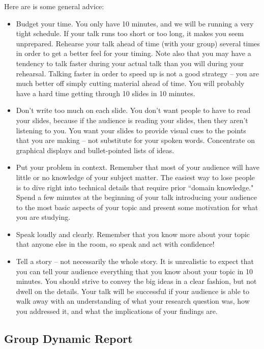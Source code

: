 \documentclass[10pt]{article}
\begin{document}
Here are is some general advice:
	\begin{itemize}
		\item Budget your time. You only have 10 minutes, and we will be running a very tight schedule. If your talk runs too short or too long, it makes you seem unprepared. Rehearse your talk ahead of time (with your group) several times in order to get a better feel for your timing. Note also that you may have a tendency to talk faster during your actual talk than you will during your rehearsal. Talking faster in order to speed up is not a good strategy -- you are much better off simply cutting material ahead of time. You will probably have a hard time getting through 10 slides in 10 minutes. 
		\item Don't write too much on each slide. You don't want people to have to read your slides, because if the audience is reading your slides, then they aren't listening to you. You want your slides to provide visual cues to the points that you are making -- not substitute for your spoken words. Concentrate on graphical displays and bullet-pointed lists of ideas. 
		\item Put your problem in context. Remember that most of your audience will have little or no knowledge of your subject matter. The easiest way to lose people is to dive right into technical details that require prior ``domain knowledge." Spend a few minutes at the beginning of your talk introducing your audience to the most basic aspects of your topic and present some motivation for what you are studying. 
		\item Speak loudly and clearly. Remember that you know more about your topic that anyone else in the room, so speak and act with confidence!
		\item Tell a story -- not necessarily the whole story. It is unrealistic to expect that you can tell your audience everything that you know about your topic in 10 minutes. You should strive to convey the big ideas in a clear fashion, but not dwell on the details. Your talk will be successful if your audience is able to walk away with an understanding of what your research question was, how you addressed it, and what the implications of your findings are. 
	\end{itemize}

\subsection{Group Dynamic Report}
\end{document}
